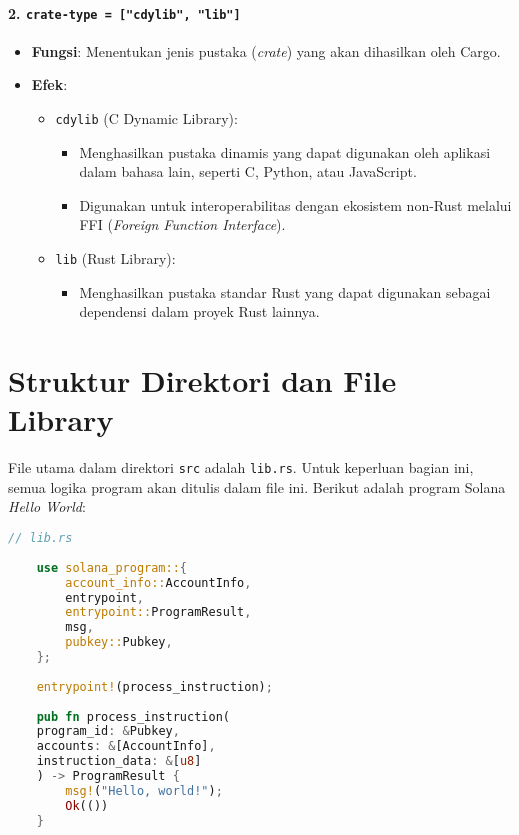 \paragraph{2. \texttt{crate-type = ["cdylib", "lib"]}}
\begin{itemize}
	\item \textbf{Fungsi}: Menentukan jenis pustaka (\textit{crate}) yang akan dihasilkan oleh Cargo.
	\item \textbf{Efek}:
	\begin{itemize}
		\item \texttt{cdylib} (C Dynamic Library):
		\begin{itemize}
			\item Menghasilkan pustaka dinamis yang dapat digunakan oleh aplikasi dalam bahasa lain, seperti C, Python, atau JavaScript.
			\item Digunakan untuk interoperabilitas dengan ekosistem non-Rust melalui FFI (\textit{Foreign Function Interface}).
		\end{itemize}
		\item \texttt{lib} (Rust Library):
		\begin{itemize}
			\item Menghasilkan pustaka standar Rust yang dapat digunakan sebagai dependensi dalam proyek Rust lainnya.
		\end{itemize}
	\end{itemize}
\end{itemize}

\section{Struktur Direktori dan File Library}
File utama dalam direktori \texttt{src} adalah \texttt{lib.rs}. Untuk keperluan bagian ini, semua logika program akan ditulis dalam file ini. Berikut adalah program Solana \textit{Hello World}:

\begin{lstlisting}[language=Rust]
	// lib.rs
	
	use solana_program::{
		account_info::AccountInfo,
		entrypoint,
		entrypoint::ProgramResult,
		msg,
		pubkey::Pubkey,
	};
	
	entrypoint!(process_instruction);
	
	pub fn process_instruction(
	program_id: &Pubkey,
	accounts: &[AccountInfo],
	instruction_data: &[u8]
	) -> ProgramResult {
		msg!("Hello, world!");
		Ok(())
	}
\end{lstlisting}

